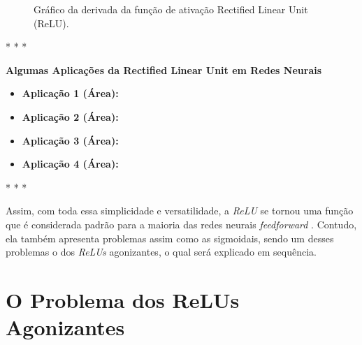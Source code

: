 \begin{figure}[h!] %
    \centering %
        \caption{Gráfico da derivada da função de ativação Rectified Linear Unit (ReLU).}
    \label{fig:relu-derivada}
\end{figure}

\medskip
\begin{center}
 * * *
\end{center}
\medskip

\textbf{Algumas Aplicações da Rectified Linear Unit em Redes Neurais}
\vspace{1em}

\begin{itemize}
    \item \textbf{Aplicação 1 (Área):}
    \item \textbf{Aplicação 2 (Área):}
    \item \textbf{Aplicação 3 (Área):}
    \item \textbf{Aplicação 4 (Área):}
\end{itemize}

\medskip
\begin{center}
 * * *
\end{center}
\medskip

Assim, com toda essa simplicidade e versatilidade, a \textit{ReLU} se tornou uma função que é considerada padrão para a maioria das redes neurais \textit{feedforward} \parencite{DeepLearningBook}. Contudo, ela também apresenta problemas assim como as sigmoidais, sendo um desses problemas o dos \textit{ReLUs} agonizantes, o qual será explicado em sequência.

\section{O Problema dos ReLUs Agonizantes}

